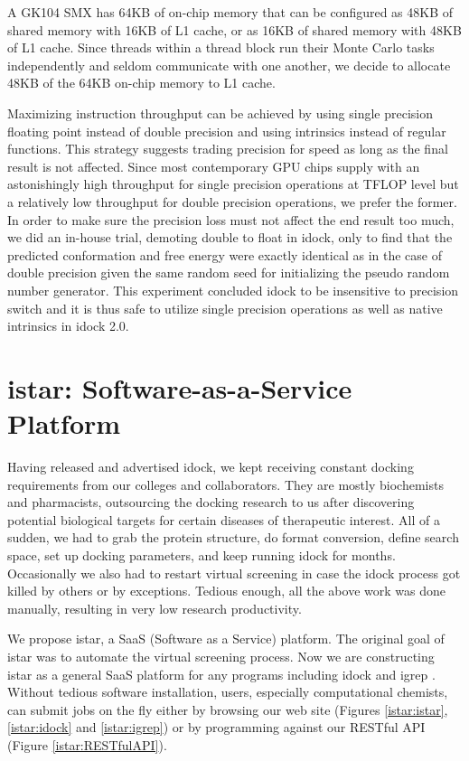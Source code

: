 A GK104 SMX has 64KB of on-chip memory that can be configured as 48KB of shared memory with 16KB of L1 cache, or as 16KB of shared memory with 48KB of L1 cache. Since threads within a thread block run their Monte Carlo tasks independently and seldom communicate with one another, we decide to allocate 48KB of the 64KB on-chip memory to L1 cache.

Maximizing instruction throughput can be achieved by using single precision floating point instead of double precision and using intrinsics instead of regular functions. This strategy suggests trading precision for speed as long as the final result is not affected. Since most contemporary GPU chips supply with an astonishingly high throughput for single precision operations at TFLOP level but a relatively low throughput for double precision operations, we prefer the former. In order to make sure the precision loss must not affect the end result too much, we did an in-house trial, demoting double to float in idock, only to find that the predicted conformation and free energy were exactly identical as in the case of double precision given the same random seed for initializing the pseudo random number generator. This experiment concluded idock to be insensitive to precision switch and it is thus safe to utilize single precision operations as well as native intrinsics in idock 2.0.

\section{istar: Software-as-a-Service Platform}

Having released and advertised idock, we kept receiving constant docking requirements from our colleges and collaborators. They are mostly biochemists and pharmacists, outsourcing the docking research to us after discovering potential biological targets for certain diseases of therapeutic interest. All of a sudden, we had to grab the protein structure, do format conversion, define search space, set up docking parameters, and keep running idock for months. Occasionally we also had to restart virtual screening in case the idock process got killed by others or by exceptions. Tedious enough, all the above work was done manually, resulting in very low research productivity.

We propose istar, a SaaS (Software as a Service) platform. The original goal of istar was to automate the virtual screening process. Now we are constructing istar as a general SaaS platform for any programs including idock \citep{1153} and igrep \citep{1138}. Without tedious software installation, users, especially computational chemists, can submit jobs on the fly either by browsing our web site (Figures \ref{istar:istar}, \ref{istar:idock} and \ref{istar:igrep}) or by programming against our RESTful API (Figure \ref{istar:RESTfulAPI}).

